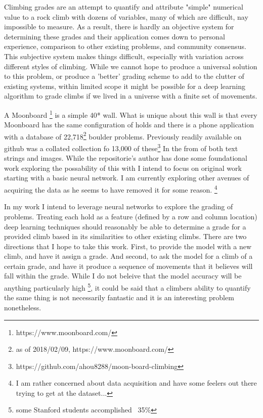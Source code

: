 \documentclass[12pt]{article}
\begin{document}
	\maketitle
	
	\clearpage
	
	\begin{flushleft}
		Climbing grades are an attempt to quantify and attribute "simple" numerical value to a rock climb with dozens of variables, many of which are difficult, nay impossible to measure. As a result, there is hardly an objective system for determining these grades and their application comes down to personal experience, comparison to other existing problems, and community consensus. This subjective system makes things difficult, especially with variation across different styles of climbing. While we cannot hope to produce a universal solution to this problem, or produce a 'better' grading scheme to add to the clutter of existing systems, within limited scope it might be possible for a deep learning algorithm to grade climbs if we lived in a universe with a finite set of movements.\\

		\vspace{0.25cm}

		A Moonboard \footnote{https://www.moonboard.com/} is a simple 40* wall. What is unique about this wall is that every Moonboard has the same configuration of holds and there is a phone application with a database of 22,718\footnote{as of 2018/02/09, https://www.moonboard.com/} boulder problems. Previously readily available on github was a collated collection fo 13,000 of these\footnote{https://github.com/ahou8288/moon-board-climbing} In the from of both text strings and images. While the repositorie's author has done some foundational work exploring the possability of this with I intend to focus on original work starting with a basic neural network. I am currently exploring other avenues of acquiring the data as he seems to have removed it for some reason. \footnote{I am rather concerned about data acquisition and have some feelers out there trying to get at the dataset...}\\

		\vspace{0.25cm}

		In my work I intend to leverage neural networks to explore the grading of problems. Treating each hold as a feature (defined by a row and column location) deep learning techniques should reasonably be able to determine a grade for a provided climb based in its similarities to other existing climbs. There are two directions that I hope to take this work. First, to provide the model with a new climb, and have it assign a grade. And second, to ask the model for a climb of a certain grade, and have it produce a sequence of movements that it believes will fall within the grade. While I do not beleive that the model accuracy will be anything particularly high \footnote{some Stanford students accomplished ~35\%}, it could be said that a climbers ability to quantify the same thing is not necessarily fantastic and it is an interesting problem nonetheless.

		\vspace{0.5cm}

		

	\end{flushleft}
\end{document}
